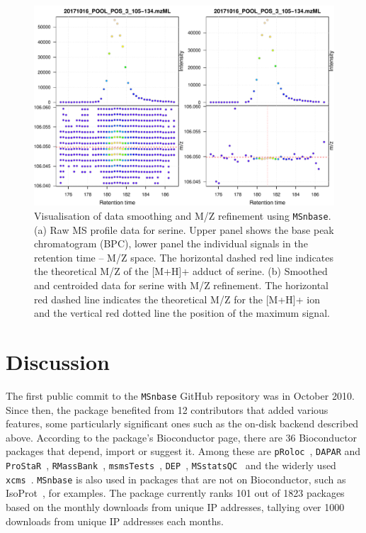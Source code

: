 \documentclass[journal=jacsat,manuscript=article]{achemso}\usepackage[]{graphicx}\usepackage[]{color}
\begin{document}
\begin{figure}
  \centering
  \includegraphics[width=\linewidth]{./figure/centroiding.pdf}
  \caption{Visualisation of data smoothing and M/Z refinement using
    \texttt{MSnbase}. (a) Raw MS profile data for serine. Upper panel
    shows the base peak chromatogram (BPC), lower panel the individual
    signals in the retention time -- M/Z space. The horizontal dashed
    red line indicates the theoretical M/Z of the [M+H]+ adduct of
    serine. (b) Smoothed and centroided data for serine with M/Z
    refinement. The horizontal red dashed line indicates the
    theoretical M/Z for the [M+H]+ ion and the vertical red dotted
    line the position of the maximum signal. }
  \label{fig:cent}
\end{figure}

\section{Discussion}

The first public commit to the \texttt{MSnbase} GitHub repository was
in October 2010. Since then, the package benefited from 12
contributors\cite{contribs} that added various features, some
particularly significant ones such as the on-disk backend described
above. According to the package's Bioconductor page, there are 36
Bioconductor packages that depend, import or suggest it. Among these
are \texttt{pRoloc}~\cite{Gatto:2014a}, \texttt{DAPAR} and
\texttt{ProStaR}~\cite{Wieczorek:2017},
\texttt{RMassBank}~\cite{Stravs:2013},
\texttt{msmsTests}~\cite{msmsTests}, \texttt{DEP}~\cite{Zhang:2018},
\texttt{MSstatsQC}~\cite{Dogu:2017} and the widerly used
\texttt{xcms}~\cite{Smith:2006}. \texttt{MSnbase} is also used in
packages that are not on Bioconductor, such as
IsoProt~\cite{Griss:2019}, for examples. The package currently ranks
101 out of 1823 packages based on the monthly downloads from unique IP
addresses, tallying over 1000 downloads from unique IP addresses each
months.
\end{document}

